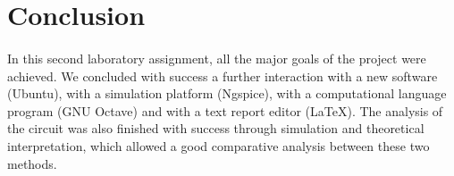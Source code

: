 \section{Conclusion}
\label{sec:conclusion}

\paragraph{}
In this second laboratory assignment, all the major goals of the project were achieved. We concluded with success a further interaction with a new software (Ubuntu), with a simulation platform (Ngspice), with a computational language program (GNU Octave) and with a text report editor (LaTeX). The analysis of the circuit was also finished with success through simulation and theoretical interpretation, which allowed a good comparative analysis between these two methods.
